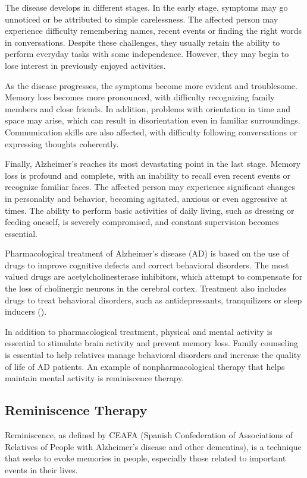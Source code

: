 The disease develops in different stages. In the early stage, symptoms may go unnoticed or be attributed to simple carelessness. The affected person may experience difficulty remembering names, recent events or finding the right words in conversations. Despite these challenges, they usually retain the ability to perform everyday tasks with some independence. However, they may begin to lose interest in previously enjoyed activities.

As the disease progresses, the symptoms become more evident and troublesome. Memory loss becomes more pronounced, with difficulty recognizing family members and close friends. In addition, problems with orientation in time and space may arise, which can result in disorientation even in familiar surroundings. Communication skills are also affected, with difficulty following conversations or expressing thoughts coherently.

Finally, Alzheimer's reaches its most devastating point in the last stage. Memory loss is profound and complete, with an inability to recall even recent events or recognize familiar faces. The affected person may experience significant changes in personality and behavior, becoming agitated, anxious or even aggressive at times. The ability to perform basic activities of daily living, such as dressing or feeding oneself, is severely compromised, and constant supervision becomes essential.

Pharmacological treatment of Alzheimer's disease (AD) is based on the use of drugs to improve cognitive defects and correct behavioral disorders. The most valued drugs are acetylcholinesterase inhibitors, which attempt to compensate for the loss of cholinergic neurons in the cerebral cortex. Treatment also includes drugs to treat behavioral disorders, such as antidepressants, tranquilizers or sleep inducers (\cite{chung2000neurobehavioral}).

In addition to pharmacological treatment, physical and mental activity is essential to stimulate brain activity and prevent memory loss. Family counseling is essential to help relatives manage behavioral disorders and increase the quality of life of AD patients. An example of nonpharmacological therapy that helps maintain mental activity is reminiscence therapy.
\subsection{Reminiscence Therapy}
Reminiscence, as defined by CEAFA (Spanish Confederation of Associations of Relatives of People with Alzheimer's disease and other dementias), is a technique that seeks to evoke memories in people, especially those related to important events in their lives.


